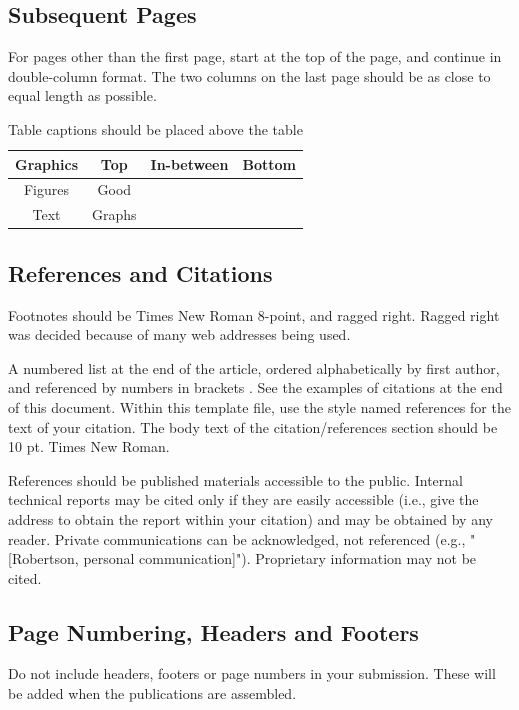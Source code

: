 	\subsection{Subsequent Pages}
	For pages other than the first page, start at the top of the page, and
	continue in double-column format. The two columns on the last page
	should be as close to equal length as possible.
	
	\begin{table}[htbp]\small
		\caption{Table captions should be placed above the table}
		\begin{tabularx}{\columnwidth}{ |c|c|>{\tblc}X|>{\tblc}X| }                    \hline
			Graphics & Top    & In-between & Bottom                                 \\ \hline
			Figures  & Good   & \multicolumn{2}{c|}{ Body text for the tables }     \\ \cline{1-2}
			Text     & Graphs & \multicolumn{2}{c|}{ should be Times Roman 10 pt. } \\ \hline
		\end{tabularx}
	\end{table}
	
	\subsection{References and Citations}
	Footnotes should be Times New Roman 8-point, and ragged right. Ragged
	right was decided because of many web addresses being used.
	\par
	A numbered list at the end of the article, ordered alphabetically by
	first author, and referenced by numbers in brackets \cite{Panther:2008}.
	See the examples of citations at the end of this document. Within this
	template file, use the style named references for the text of your
	citation. The body text of the citation/references section should be
	10 pt. Times New Roman.
	\par
	References should be published materials accessible to the public.
	Internal technical reports may be cited only if they are easily accessible 
	(i.e., give the address to obtain the report within your citation) and may
	be obtained by any reader. Private communications can be acknowledged, not
	referenced (e.g., "[Robertson, personal communication]"). Proprietary
	information may not be cited.
	
	\subsection{Page Numbering, Headers and Footers}
	Do not include headers, footers or page numbers in your submission.
	These will be added when the publications are assembled.

